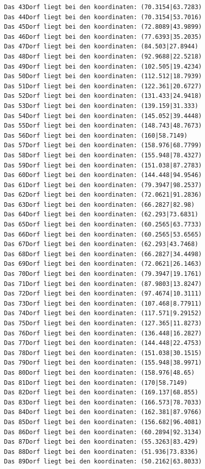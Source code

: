 \documentclass{article}
\begin{document}
\begin{verbatim}
Das 43Dorf liegt bei den koordinaten: (70.3154|63.7283)
Das 44Dorf liegt bei den koordinaten: (70.3154|53.7016)
Das 45Dorf liegt bei den koordinaten: (72.8089|43.9899)
Das 46Dorf liegt bei den koordinaten: (77.6393|35.2035)
Das 47Dorf liegt bei den koordinaten: (84.503|27.8944)
Das 48Dorf liegt bei den koordinaten: (92.9688|22.5218)
Das 49Dorf liegt bei den koordinaten: (102.505|19.4234)
Das 50Dorf liegt bei den koordinaten: (112.512|18.7939)
Das 51Dorf liegt bei den koordinaten: (122.361|20.6727)
Das 52Dorf liegt bei den koordinaten: (131.433|24.9418)
Das 53Dorf liegt bei den koordinaten: (139.159|31.333)
Das 54Dorf liegt bei den koordinaten: (145.052|39.4448)
Das 55Dorf liegt bei den koordinaten: (148.743|48.7673)
Das 56Dorf liegt bei den koordinaten: (160|58.7149)
Das 57Dorf liegt bei den koordinaten: (158.976|68.7799)
Das 58Dorf liegt bei den koordinaten: (155.948|78.4327)
Das 59Dorf liegt bei den koordinaten: (151.038|87.2783)
Das 60Dorf liegt bei den koordinaten: (144.448|94.9546)
Das 61Dorf liegt bei den koordinaten: (79.3947|98.2537)
Das 62Dorf liegt bei den koordinaten: (72.0621|91.2836)
Das 63Dorf liegt bei den koordinaten: (66.2827|82.98)
Das 64Dorf liegt bei den koordinaten: (62.293|73.6831)
Das 65Dorf liegt bei den koordinaten: (60.2565|63.7733)
Das 66Dorf liegt bei den koordinaten: (60.2565|53.6565)
Das 67Dorf liegt bei den koordinaten: (62.293|43.7468)
Das 68Dorf liegt bei den koordinaten: (66.2827|34.4498)
Das 69Dorf liegt bei den koordinaten: (72.0621|26.1463)
Das 70Dorf liegt bei den koordinaten: (79.3947|19.1761)
Das 71Dorf liegt bei den koordinaten: (87.9803|13.8247)
Das 72Dorf liegt bei den koordinaten: (97.4674|10.3111)
Das 73Dorf liegt bei den koordinaten: (107.468|8.77911)
Das 74Dorf liegt bei den koordinaten: (117.571|9.29152)
Das 75Dorf liegt bei den koordinaten: (127.365|11.8273)
Das 76Dorf liegt bei den koordinaten: (136.448|16.2827)
Das 77Dorf liegt bei den koordinaten: (144.448|22.4753)
Das 78Dorf liegt bei den koordinaten: (151.038|30.1515)
Das 79Dorf liegt bei den koordinaten: (155.948|38.9971)
Das 80Dorf liegt bei den koordinaten: (158.976|48.65)
Das 81Dorf liegt bei den koordinaten: (170|58.7149)
Das 82Dorf liegt bei den koordinaten: (169.137|68.855)
Das 83Dorf liegt bei den koordinaten: (166.573|78.7033)
Das 84Dorf liegt bei den koordinaten: (162.381|87.9766)
Das 85Dorf liegt bei den koordinaten: (156.682|96.4081)
Das 86Dorf liegt bei den koordinaten: (60.2894|92.3134)
Das 87Dorf liegt bei den koordinaten: (55.3263|83.429)
Das 88Dorf liegt bei den koordinaten: (51.936|73.8336)
Das 89Dorf liegt bei den koordinaten: (50.2162|63.8033)

\end{verbatim}
\end{document}
